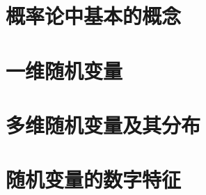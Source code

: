 
\usepackage{ctex}
\usepackage{pifont}
\usepackage{cleveref}





\part{概率论中基本的概念}

\begin{shaded}
    
\end{shaded}

\begin{shaded}
    
\end{shaded}


\begin{shaded}
    
\end{shaded}

\part{一维随机变量}





\part{多维随机变量及其分布}





\part{随机变量的数字特征}







